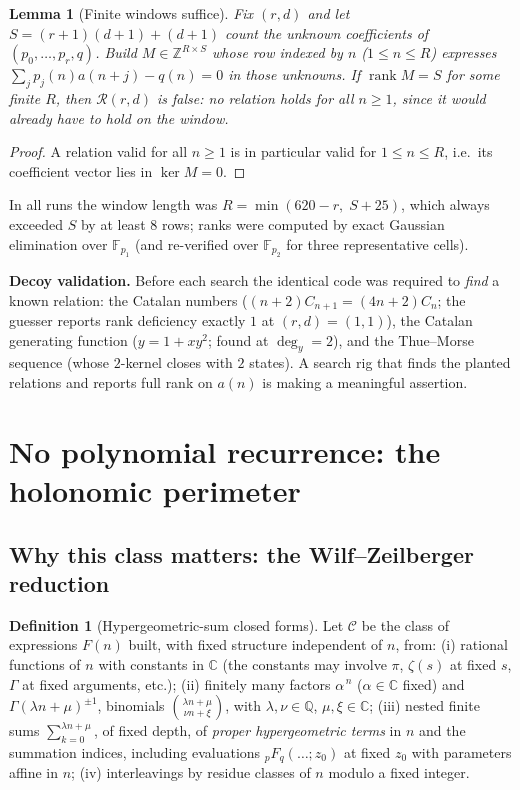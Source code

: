 \documentclass[11pt]{article}
\newtheorem{lemma}[theorem]{Lemma}
\theoremstyle{definition}
\newtheorem{definition}[theorem]{Definition}
\DeclareMathOperator{\rank}{rank}
\DeclareMathOperator{\Ker}{ker}
\newcommand{\ZZ}{\mathbb{Z}}
\newcommand{\QQ}{\mathbb{Q}}
\newcommand{\CC}{\mathbb{C}}
\newcommand{\FF}{\mathbb{F}}
\begin{document}
\begin{lemma}[Finite windows suffice]\label{lem:finitewindow}
Fix $(r,d)$ and let $S=(r+1)(d+1)+(d+1)$ count the unknown coefficients of
$(p_0,\dots,p_r,q)$. Build $M\in\ZZ^{R\times S}$ whose row indexed by $n$
($1\le n\le R$) expresses $\sum_j p_j(n)a(n+j)-q(n)=0$ in those unknowns. If
$\rank M=S$ for some finite $R$, then $\mathcal{R}(r,d)$ is false: no relation
holds for all $n\ge1$, since it would already have to hold on the window.
\end{lemma}

\begin{proof}
A relation valid for all $n\ge1$ is in particular valid for $1\le n\le R$, i.e.\
its coefficient vector lies in $\Ker M=0$.
\end{proof}

In all runs the window length was $R=\min(620-r,\;S+25)$, which always exceeded
$S$ by at least $8$ rows; ranks were computed by exact Gaussian elimination over
$\FF_{p_1}$ (and re-verified over $\FF_{p_2}$ for three representative cells).

\medskip
\noindent\textbf{Decoy validation.} Before each search the identical code was
required to \emph{find} a known relation: the Catalan numbers
($(n+2)C_{n+1}=(4n+2)C_n$; the guesser reports rank deficiency exactly $1$ at
$(r,d)=(1,1)$), the Catalan generating function ($y=1+xy^2$; found at
$\deg_y=2$), and the Thue--Morse sequence (whose $2$-kernel closes with $2$
states). A search rig that finds the planted relations and reports full rank on
$a(n)$ is making a meaningful assertion.

\section{No polynomial recurrence: the holonomic perimeter}\label{sec:holo}

\subsection{Why this class matters: the Wilf--Zeilberger reduction}

\begin{definition}[Hypergeometric-sum closed forms]\label{def:class}
Let $\mathcal{C}$ be the class of expressions $F(n)$ built, with fixed structure
independent of $n$, from:
(i) rational functions of $n$ with constants in $\CC$ (the constants may involve
$\pi$, $\zeta(s)$ at fixed $s$, $\Gamma$ at fixed arguments, etc.);
(ii) finitely many factors $\alpha^{\,n}$ ($\alpha\in\CC$ fixed) and
$\Gamma(\lambda n+\mu)^{\pm1}$, binomials $\binom{\lambda n+\mu}{\nu n+\xi}$,
with $\lambda,\nu\in\QQ$, $\mu,\xi\in\CC$;
(iii) nested finite sums $\sum_{k=0}^{\lambda n+\mu}$, of fixed depth, of
\emph{proper hypergeometric terms} \cite{WilfZeilberger1992,PWZ1996} in $n$ and
the summation indices, including evaluations ${}_pF_q(\dots;z_0)$ at fixed
$z_0$ with parameters affine in $n$;
(iv) interleavings by residue classes of $n$ modulo a fixed integer.
\end{definition}
\end{document}
